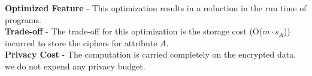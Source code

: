 \textbf{Optimized Feature} - This optimization results in a reduction in the run time of \system programs. \\
\textbf{Trade-off} - The trade-off for this optimization is the storage cost (O($m\cdot s_A$)) incurred to store the ciphers for attribute $A$.\\
\textbf{Privacy Cost} - The computation is carried completely on the encrypted data, we do not expend any privacy budget.


